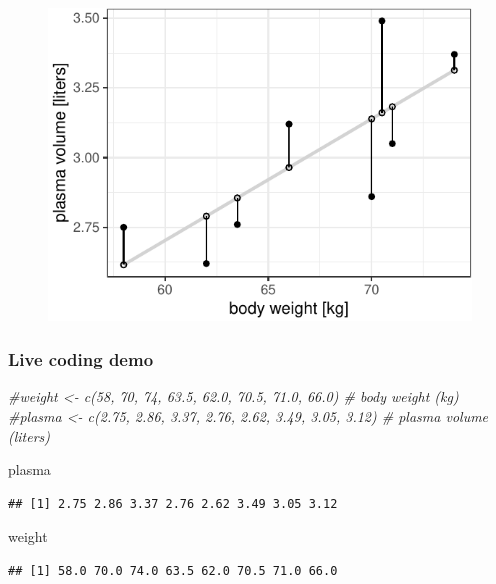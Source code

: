 \documentclass[]{article}
\newenvironment{Shaded}{\begin{snugshade}}{\end{snugshade}}
\newcommand{\CommentTok}[1]{\textcolor[rgb]{0.56,0.35,0.01}{\textit{#1}}}
\newcommand{\NormalTok}[1]{#1}
\begin{document}
\begin{figure}[H]

{\centering \includegraphics{session-regression-I-files/figures/rse-1} 

}

\end{figure}

\hypertarget{live-coding-demo-2}{%
\subsubsection{Live coding demo}\label{live-coding-demo-2}}

\begin{Shaded}
\begin{Highlighting}[]
\CommentTok{#weight <- c(58, 70, 74, 63.5, 62.0, 70.5, 71.0, 66.0) # body weight (kg)}
\CommentTok{#plasma <- c(2.75, 2.86, 3.37, 2.76, 2.62, 3.49, 3.05, 3.12) # plasma volume (liters)}

\NormalTok{plasma}
\end{Highlighting}
\end{Shaded}

\begin{verbatim}
## [1] 2.75 2.86 3.37 2.76 2.62 3.49 3.05 3.12
\end{verbatim}

\begin{Shaded}
\begin{Highlighting}[]
\NormalTok{weight }
\end{Highlighting}
\end{Shaded}

\begin{verbatim}
## [1] 58.0 70.0 74.0 63.5 62.0 70.5 71.0 66.0
\end{verbatim}
\end{document}
